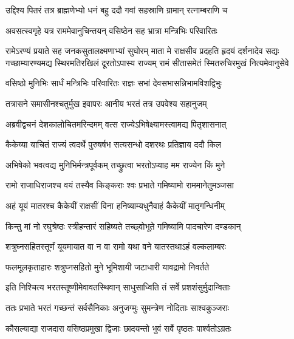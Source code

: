 \twolineshloka
{उद्दिश्य पितरं तत्र ब्राह्मणेभ्यो धनं बहु}
{ददौ गवां सहस्राणि ग्रामान् रत्नाम्बराणि च} %

\twolineshloka
{अवसत्स्वगृहे यत्र राममेवानुचिन्तयन्}
{वसिष्ठेन सह भ्रात्रा मन्त्रिभिः परिवारितः} %

\fourlineindentedshloka
{रामेऽरण्यं प्रयाते सह जनकसुतालक्ष्मणाभ्यां सुघोरम्}
{माता मे राक्षसीव प्रदहति हृदयं दर्शनादेव सद्यः}
{गच्छाम्यारण्यमद्य स्थिरमतिरखिलं दूरतोऽपास्य राज्यम्}
{रामं सीतासमेतं स्मितरुचिरमुखं नित्यमेवानुसेवे} %





\twolineshloka
{वसिष्ठो मुनिभिः सार्धं मन्त्रिभिः परिवारितः}
{राज्ञः सभां देवसभासन्निभामविशद्विभुः} %

\twolineshloka
{तत्रासने समासीनश्चतुर्मुख इवापरः}
{आनीय भरतं तत्र उपवेश्य सहानुजम्} %

\twolineshloka
{अब्रवीद्वचनं देशकालोचितमरिन्दमम्}
{वत्स राज्येऽभिषेक्ष्यामस्त्वामद्य पितृशासनात्} %

\twolineshloka
{कैकेय्या याचितं राज्यं त्वदर्थे पुरुषर्षभ}
{सत्यसन्धो दशरथः प्रतिज्ञाय ददौ किल} %

\twolineshloka
{अभिषेको भवत्वद्य मुनिभिर्मन्त्रपूर्वकम्}
{तच्छ्रुत्वा भरतोऽप्याह मम राज्येन किं मुने} %

\twolineshloka
{रामो राजाधिराजश्च वयं तस्यैव किङ्कराः}
{श्वः प्रभाते गमिष्यामो राममानेतुमञ्जसा} %

\twolineshloka
{अहं यूयं मातरश्च कैकेयीं राक्षसीं विना}
{हनिष्याम्यधुनैवाहं कैकेयीं मातृगन्धिनीम्} %

\twolineshloka
{किन्तु मां नो रघुश्रेष्ठः स्त्रीहन्तारं सहिष्यते}
{तच्छ्वोभूते गमिष्यामि पादचारेण दण्डकान्} %

\twolineshloka
{शत्रुघ्नसहितस्तूर्णं यूयमायात वा न वा}
{रामो यथा वने यातस्तथाऽहं वल्कलाम्बरः} %

\twolineshloka
{फलमूलकृताहारः शत्रुघ्नसहितो मुने}
{भूमिशायी जटाधारी यावद्रामो निवर्तते} %

\twolineshloka
{इति निश्चित्य भरतस्तूष्णीमेवावतस्थिवान्}
{साधुसाध्विति तं सर्वे प्रशशंसुर्मुदान्विताः} %

\twolineshloka
{ततः प्रभाते भरतं गच्छन्तं सर्वसैनिकाः}
{अनुजग्मुः सुमन्त्रेण नोदिताः साश्वकुञ्जराः} %

\twolineshloka
{कौसल्याद्या राजदारा वसिष्ठप्रमुखा द्विजाः}
{छादयन्तो भुवं सर्वे पृष्ठतः पार्श्वतोऽग्रतः} %

